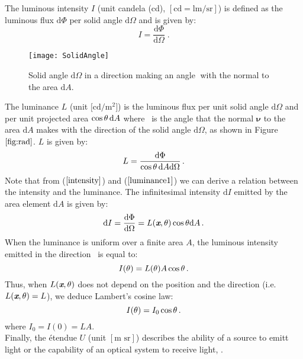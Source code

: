The luminous intensity $I$ (unit candela (\textrm{cd}), $[\textrm{cd}=\textrm{lm}/\textrm{sr}]$) is defined as the luminous flux $\textrm{d}\Phi$ per solid angle
$\textrm{d}\Omega$ and is given by:
\begin{equation}\label{intensity}
I = \frac{\textrm{d}\Phi}{\textrm{d}\Omega}\;.
\end{equation}
 \begin{figure}[h]
  \begin{center}
  \texttt{[image: SolidAngle]}
  \end{center}
  \caption{Solid angle $\textrm{d}\Omega$ in a direction making an angle \myangle $\;$with the normal to the area $\textrm{d}A$.}
  \label{fig:rad}
  \end{figure}The luminance $L$ \big(unit $\big[\textrm{cd} / \textrm{m}^2\big]$\big) is the luminous flux per unit solid angle $\textrm{d}\Omega$ and  per unit projected area $\cos\mbox{$\theta$}\,\textrm{d}A$ where \myangle $\,$ is the angle that the normal $\boldsymbol{\nu}$ to the area $\textrm{d}A$ makes with the direction of the solid angle $\textrm{d}\Omega$, as shown in Figure $\ref{fig:rad}$.  $L$  is given by:
\begin{equation}\label{luminance1}
  L=\frac{\textrm{d}\Phi}{\cos\mbox{$\theta$}\,\textrm{d}A\textrm{d}\Omega}\,.
\end{equation}
\noindent Note that from ($\ref{intensity}$) and ($\ref{luminance1}$) we can derive a relation between the intensity and the luminance. The infinitesimal intensity $\textrm{d}I $ emitted by the area element $\textrm{d}A$ is given by:
\begin{equation}
\textrm{d}I = \frac{\textrm{d}\Phi}{\textrm{d}\Omega}= L(\textit{\textbf{x}},\mbox{$\theta$})\cos\mbox{$\theta$}\textrm{d}A \,.
\end{equation}
When the luminance is uniform over a finite area $A$, the luminous intensity emitted in the direction \myangle $\,$ is equal to:
\begin{equation}
I(\mbox{$\theta$}) = L(\mbox{$\theta$}) A \cos\mbox{$\theta$}\,.
\end{equation}
Thus, when $L(\textit{\textbf{x}},\mbox{$\theta$})$ does not depend on the position and the direction (i.e. $L(\textit{\textbf{x}},\mbox{$\theta$})=L$), we deduce Lambert's cosine law:
\begin{equation}
I(\mbox{$\theta$}) = I_0\cos\mbox{$\theta$}\,.
\end{equation}
where $I_0 = I(0) = LA$. \\
\indent Finally, the \'{e}tendue $U$ (unit $[\textrm{m sr}]$) describes the ability of a source to emitt light or the capability of an optical system to receive light, \cite{zhu2011etendue}.
